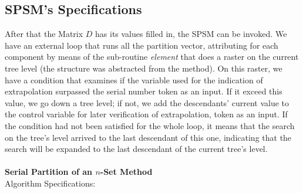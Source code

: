 \documentclass {amsart}
\begin{document}
\subsection*{SPSM's Specifications}

After that the Matrix {$D$} has its values filled in, the SPSM can
be invoked. We have an external loop that runs all the partition
vector, attributing for each component by means of the sub-routine
\emph{element} that does a raster on the current tree level (the
structure was abstracted from the method). On this raster, we have
a condition that examines if the variable used for the indication
of extrapolation surpassed the serial number token as an input. If
it exceed this value, we go down a tree level; if not, we add the
descendants' current value to the control variable for later
verification of extrapolation, token as an input. If the condition
had not been satisfied for the whole loop, it means that the
search on the tree's level arrived to the last descendant of this
one, indicating that the search will be expanded to the last
descendant of the current tree's level.
\\\\
\textbf{Serial Partition of an {$n$}-Set Method}\\
Algorithm Specifications:
\end{document}
